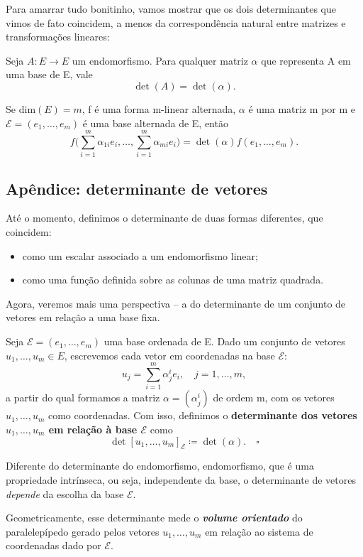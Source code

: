 \documentclass[../differential_forms.tex]{subfiles}
\begin{document}
Para amarrar tudo bonitinho, vamos mostrar que os dois determinantes que vimos de fato coincidem, a menos da correspondência natural entre matrizes e transformações lineares:
\begin{prop*}
	Seja \(A:E\rightarrow E\) um endomorfismo. Para qualquer matriz \(\alpha \) que representa A em uma base de E, vale
	\[
		\det{(A)} = \det{(\alpha )}.
	\]
\end{prop*}
\begin{crl*}
	Se \(\mathrm{dim}(E)=m\), f é uma forma m-linear alternada, \(\alpha \) é uma matriz m por m e \(\mathcal{E}=(e_1,\dotsc , e_{m})\) é uma base alternada de E, então
	\[
		f\biggl(\sum\limits_{i=1}^{m}\alpha_{1i}e_{i}, \dotsc , \sum\limits_{i=1}^{m}\alpha_{mi}e_{i}\biggr) = \det{(\alpha )}f(e_1,\dotsc , e_{m}).
	\]
\end{crl*}

\subsection{Apêndice: determinante de vetores}
Até o momento, definimos o determinante de duas formas diferentes, que coincidem:
\begin{itemize}
	\item como um escalar associado a um endomorfismo linear;
	\item como uma função definida sobre as colunas de uma matriz quadrada.
\end{itemize}
Agora, veremos mais uma perspectiva -- a do determinante de um conjunto de vetores em relação a uma base fixa.
\begin{def*}
	Seja \(\mathcal{E}=(e_1,\dotsc , e_{m})\) uma base ordenada de E. Dado um conjunto de vetores \(u_1, \dotsc , u_{m}\in E\), escrevemos cada vetor em coordenadas na base \(\mathcal{E}:\)
	\[
		u_{j}=\sum\limits_{i=1}^{m} \alpha_{j}^{i}e_{i},\quad j=1,\dotsc ,m,
	\]
	a partir do qual formamos a matriz \(\alpha =(\alpha_{j}^{i})\) de ordem m, com os vetores \(u_1,\dotsc , u_{m}\) como coordenadas. Com isso, definimos o \textbf{determinante dos vetores \(u_1,\dotsc , u_{m}\) em relação à base \(\mathcal{E}\)} como
	\[
		\det{[u_{1},\dotsc , u_{m}]}_{\mathcal{E}}\coloneqq \det{(\alpha )}. \quad \square
	\]
\end{def*}
\begin{tcolorbox}[
		skin=enhanced,
		title=Observação,
		fonttitle=\bfseries,
		colframe=black,
		colbacktitle=cyan!75!white,
		colback=cyan!15,
		colbacklower=black,
		coltitle=black,
		drop fuzzy shadow,
	]
	Diferente do determinante do endomorfismo, endomorfismo, que é uma propriedade intrínseca, ou seja, independente da base, o determinante de vetores \textit{depende} da escolha da base \(\mathcal{E}.\)

	Geometricamente, esse determinante mede o \textit{\textbf{volume orientado}} do paralelepípedo gerado pelos vetores \(u_1,\dotsc , u_{m}\) em relação ao sistema de coordenadas dado por \(\mathcal{E}.\)
\end{tcolorbox}
\end{document}
